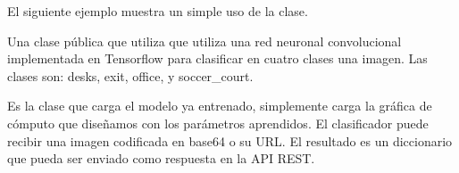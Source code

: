 El siguiente ejemplo
muestra un simple uso de la clase.

%
%

\begin{sphinxVerbatim}[commandchars=\\\{\}]
   
  
  
\end{sphinxVerbatim}




Una clase pública que utiliza que utiliza una red neuronal
convolucional implementada en Tensorflow para clasificar en cuatro
clases una imagen. Las clases son:
desks,
exit,
office,
y soccer\_court.

Es la clase que carga el modelo ya entrenado, simplemente carga
la gráfica de cómputo que diseñamos con los parámetros
aprendidos. El clasificador puede
recibir una imagen codificada en base64 o su URL. El resultado
es un diccionario que pueda ser enviado como respuesta en la API
REST.

